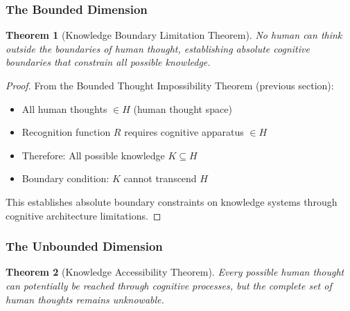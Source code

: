 \documentclass[12pt,a4paper]{article}
\newtheorem{theorem}{Theorem}[section]
\begin{document}
\subsubsection{The Bounded Dimension}

\begin{theorem}[Knowledge Boundary Limitation Theorem]
No human can think outside the boundaries of human thought, establishing absolute cognitive boundaries that constrain all possible knowledge.
\end{theorem}

\begin{proof}
From the Bounded Thought Impossibility Theorem (previous section):
\begin{itemize}
\item All human thoughts $\in H$ (human thought space)
\item Recognition function $R$ requires cognitive apparatus $\in H$
\item Therefore: All possible knowledge $K \subseteq H$
\item Boundary condition: $K$ cannot transcend $H$
\end{itemize}

This establishes absolute boundary constraints on knowledge systems through cognitive architecture limitations.
\end{proof}

\subsubsection{The Unbounded Dimension}

\begin{theorem}[Knowledge Accessibility Theorem]
Every possible human thought can potentially be reached through cognitive processes, but the complete set of human thoughts remains unknowable.
\end{theorem}
\end{document}
